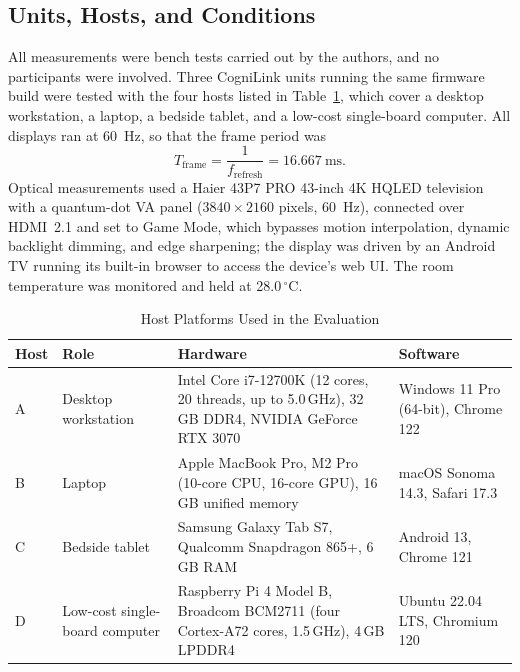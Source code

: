 \documentclass[journal]{IEEEtran}
\newcommand{\degC}{\ensuremath{^{\circ}}C}
\begin{document}
\subsection{Units, Hosts, and Conditions}
All measurements were bench tests carried out by the authors, and no participants were involved. Three CogniLink units running the same firmware build were tested with the four hosts listed in Table~\ref{tab:hosts}, which cover a desktop workstation, a laptop, a bedside tablet, and a low-cost single-board computer. All displays ran at 60~Hz, so that the frame period was
\begin{equation}
T_{\mathrm{frame}}=\frac{1}{f_{\mathrm{refresh}}}=16.667~\text{ms}.
\label{eq:frame}
\end{equation}
Optical measurements used a Haier 43P7 PRO 43-inch 4K HQLED television with a quantum-dot VA panel ($3840\times2160$ pixels, 60~Hz), connected over HDMI~2.1 and set to Game Mode, which bypasses motion interpolation, dynamic backlight dimming, and edge sharpening; the display was driven by an Android TV running its built-in browser to access the device's web UI. The room temperature was monitored and held at 28.0\,\degC.

\begin{table}[!t]
\caption{Host Platforms Used in the Evaluation}
\label{tab:hosts}
\centering
\footnotesize
\setlength{\tabcolsep}{3pt}
\begin{tabular}{@{}l>{\raggedright\arraybackslash}p{1.45cm}>{\raggedright\arraybackslash}p{3.65cm}>{\raggedright\arraybackslash}p{2.05cm}@{}}
\toprule
Host & Role & Hardware & Software \\
\midrule
A & Desktop workstation & Intel Core i7-12700K (12 cores, 20 threads, up to 5.0\,GHz), 32\,GB DDR4, NVIDIA GeForce RTX 3070 & Windows 11 Pro (64-bit), Chrome 122 \\
B & Laptop & Apple MacBook Pro, M2 Pro (10-core CPU, 16-core GPU), 16\,GB unified memory & macOS Sonoma 14.3, Safari 17.3 \\
C & Bedside tablet & Samsung Galaxy Tab S7, Qualcomm Snapdragon 865+, 6\,GB RAM & Android 13, Chrome 121 \\
D & Low-cost single-board computer & Raspberry Pi 4 Model B, Broadcom BCM2711 (four Cortex-A72 cores, 1.5\,GHz), 4\,GB LPDDR4 & Ubuntu 22.04 LTS, Chromium 120 \\
\bottomrule
\end{tabular}
\end{table}
\end{document}
